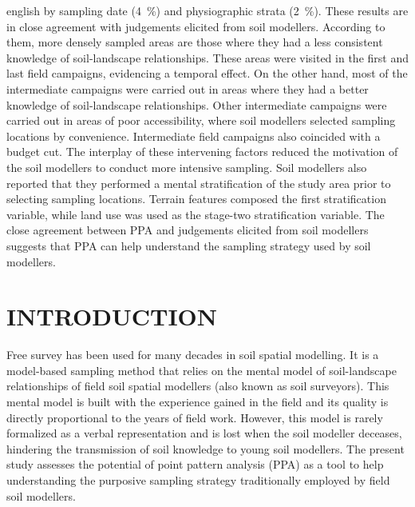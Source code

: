\begin{chapterabstract}{english}{\englishkeys}
by sampling date (\SI{4}{\percent}) and physiographic strata (\SI{2}{\percent}). These results are in close 
agreement with judgements elicited from soil modellers. According to them, more densely sampled areas are those 
where they had a less consistent knowledge of soil-landscape relationships. These areas were visited in the 
first and last field campaigns, evidencing a temporal effect. On the other hand, most of the intermediate 
campaigns were carried out in areas where they had a better knowledge of soil-landscape relationships. Other 
intermediate campaigns were carried out in areas of poor accessibility, where soil modellers selected sampling 
locations by convenience. Intermediate field campaigns also coincided with a budget cut. The interplay of these 
intervening factors reduced the motivation of the soil modellers to conduct more intensive sampling. Soil 
modellers also reported that they performed a mental stratification of the study area prior to selecting 
sampling locations. Terrain features composed the first stratification variable, while land use was used as the 
stage-two stratification variable. The close agreement between PPA and judgements elicited from soil modellers 
suggests that PPA can help understand the sampling strategy used by soil modellers.
\end{chapterabstract}

\formatchapter

\section{INTRODUCTION}


Free survey has been used for many decades in soil spatial modelling. It is a model-based sampling method that 
relies on the mental model of soil-landscape relationships of field soil spatial modellers (also known as 
soil surveyors). This mental model is built with the experience gained in the field and its quality is directly 
proportional to the years of field work. However, this model is rarely formalized as a verbal representation 
and is lost when the soil modeller deceases, hindering the transmission of soil knowledge to young soil 
modellers. The present study assesses the potential of point pattern analysis (PPA) as a tool to help 
understanding the purposive sampling strategy traditionally employed by field soil modellers.

